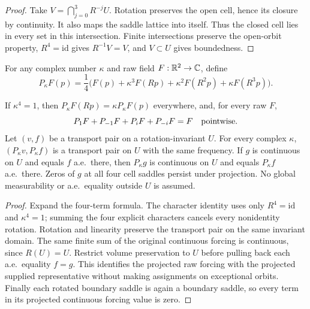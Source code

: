 \begin{proof}
\leanok
Take $V=\bigcap_{j=0}^3 R^{-j}U$.
Rotation preserves the open cell, hence its closure by continuity.
It also maps the saddle lattice into itself. Thus the closed cell lies
in every set in this intersection. Finite intersections preserve the
open-orbit property, $R^4=\mathrm{id}$ gives $R^{-1}V=V$, and $V\subset U$
gives boundedness.
\end{proof}

\begin{definition}
\label{def:transport-quarter-projection}
\leanok
For any complex number $\kappa$ and raw field $F:\mathbb{R}^2\to\mathbb{C}$, define
\[
 P_\kappa F(p)=\frac14\bigl(F(p)+\kappa^3F(Rp)
       +\kappa^2F(R^2p)+\kappa F(R^3p)\bigr).
\]
\end{definition}

\begin{lemma}
\label{lem:transport-quarter-projections}
\leanok
If $\kappa^4=1$, then $P_\kappa F(Rp)=\kappa P_\kappa F(p)$ everywhere,
and, for every raw $F$,
\[
 P_1F+P_{-1}F+P_iF+P_{-i}F=F
 \quad\hbox{pointwise}.
\]
Let $(v,f)$ be a transport pair on a rotation-invariant $U$.
For every complex $\kappa$, $(P_\kappa v,P_\kappa f)$ is a transport pair
on $U$ with the same frequency. If $g$ is continuous on $U$ and equals $f$
a.e.\ there, then $P_\kappa g$ is continuous on $U$ and equals $P_\kappa f$
a.e.\ there. Zeros of $g$ at all four cell saddles persist under projection.
No global measurability or a.e.\ equality outside $U$ is assumed.
\end{lemma}

\begin{proof}
\leanok
Expand the four-term formula. The character identity uses only
$R^4=\mathrm{id}$ and $\kappa^4=1$; summing the four explicit characters
cancels every nonidentity rotation. Rotation and linearity preserve the
transport pair on the same invariant domain. The same finite sum of the
original continuous forcing is continuous, since $R(U)=U$.
Restrict volume preservation to $U$ before pulling back each a.e.\ equality
$f=g$. This identifies the projected raw forcing with the projected supplied
representative without making assignments on exceptional orbits.
Finally each rotated boundary saddle is again a boundary saddle, so every
term in its projected continuous forcing value is zero.
\end{proof}

